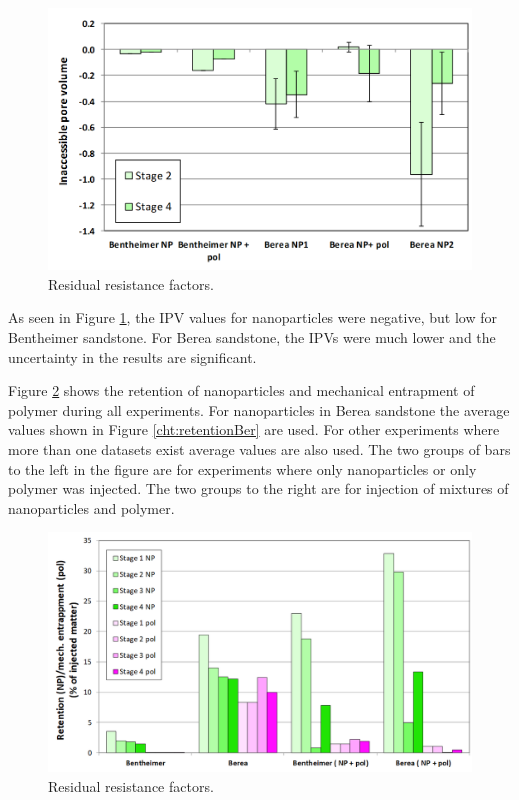 \begin{figure}[p]
    \centering
    \includegraphics[width=\textwidth]{img/cht/ipvNP.png}
    \caption{Residual resistance factors.}
    \label{cht:ipvNP} %
\end{figure}

As seen in Figure \ref{cht:ipvNP}, the IPV values for nanoparticles were negative, but low for Bentheimer sandstone. For Berea sandstone, the IPVs were much lower and the uncertainty in the results are significant. 

Figure \ref{cht:retentionMech} shows the retention of nanoparticles and mechanical entrapment of polymer during all experiments. For nanoparticles in Berea sandstone the average values shown in Figure \ref{cht:retentionBer} are used. For other experiments where more than one datasets exist average values are also used. The two groups of bars to the left in the figure are for experiments where only nanoparticles or only polymer was injected. The two groups to the right are for injection of mixtures of nanoparticles and polymer.

\begin{figure}[h]
    \centering
    \includegraphics[width=\textwidth]{img/cht/retentionMech.png}
    \caption{Residual resistance factors.}
    \label{cht:retentionMech} %
\end{figure}

